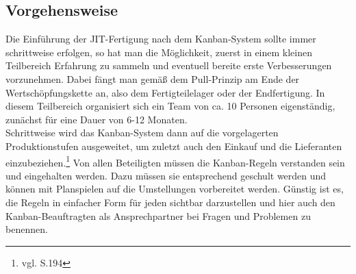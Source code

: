 \subsection{Vorgehensweise}
Die Einführung der JIT-Fertigung nach dem Kanban-System sollte immer schrittweise erfolgen,
so hat man die Möglichkeit, zuerst in einem kleinen Teilbereich Erfahrung zu 
sammeln und eventuell bereite erste Verbesserungen vorzunehmen. 
Dabei fängt man gemäß dem Pull-Prinzip am Ende der Wertschöpfungskette an, 
also dem Fertigteilelager oder der Endfertigung. 
In diesem Teilbereich organisiert sich ein Team von ca. 10 Personen eigenständig, zunächst für eine Dauer von 6-12 Monaten.\\
Schrittweise wird das Kanban-System dann auf die vorgelagerten Produktionstufen ausgeweitet, 
um zuletzt auch den Einkauf und die Lieferanten einzubeziehen.\footnote{vgl. \cite{Takeda2012SPS} S.194}
Von allen Beteiligten müssen die Kanban-Regeln verstanden sein und eingehalten werden. 
Dazu müssen sie entsprechend geschult werden und können mit Planspielen auf die Umstellungen vorbereitet werden.
Günstig ist es, die Regeln in einfacher Form für jeden sichtbar darzustellen und hier auch den 
Kanban-Beauftragten als Ansprechpartner bei Fragen und Problemen zu benennen.

